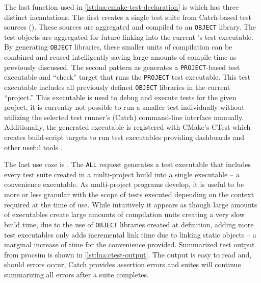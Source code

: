 The last function used in \cref{lst:lua:cmake-test-declaration} is  which has three distinct incantations. The first creates a single test suite from Catch-based test sources (\cite{CatchLib}). These sources are aggregated and compiled to an \texttt{OBJECT} library. The test objects are aggregated for future linking into the current 's test executable. By generating \texttt{OBJECT} libraries, these smaller units of compilation can be combined and reused intelligently saving large amounts of compile time as previously discussed. The second pattern as  generates a \texttt{PROJECT}-based test executable and ``check'' target that runs the \texttt{PROJECT} test executable. This test executable includes all previously defined \texttt{OBJECT} libraries in the current ``project.'' This executable is used to debug and execute tests for the given project, it is currently not possible to run a smaller test individually without utilizing the selected test runner's (Catch) command-line interface manually. Additionally, the generated executable is registered with CMake's CTest which creates build-script targets to run test executables providing dashboards and other useful tools \cite{CMake:CTest}. 

The last use case is . The \texttt{ALL} request generates a test executable that includes every test suite created in a multi-project build into a single executable -- a convenience executable. As multi-project programs develop, it is useful to be more or less granular with the scope of tests executed depending on the context required at the time of use. While intuitively it appears as though large amounts of executables create large amounts of compilation units creating a very slow build time, due to the use of \texttt{OBJECT} libraries created at definition, adding more test executables only adds incremental link time due to linking static objects -- a marginal increase of time for the convenience provided. Summarized test output from procsim is shown in \cref{lst:lua:ctest-output}. The output is easy to read and, should errors occur, Catch provides assertion errors and suites will continue summarizing all errors after a suite completes.

